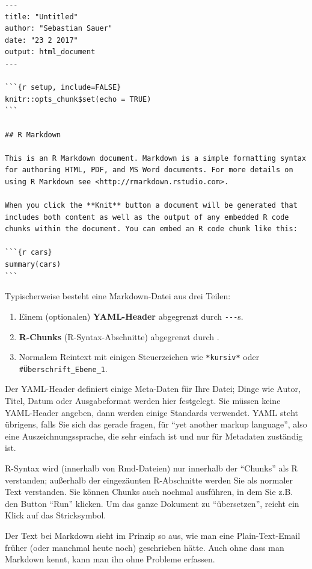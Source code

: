 \documentclass[12pt,]{book}
\providecommand{\tightlist}{%
  \setlength{\itemsep}{0pt}\setlength{\parskip}{0pt}}
\begin{document}
\begin{verbatim}
---
title: "Untitled"
author: "Sebastian Sauer"
date: "23 2 2017"
output: html_document
---

```{r setup, include=FALSE}
knitr::opts_chunk$set(echo = TRUE)
```

## R Markdown

This is an R Markdown document. Markdown is a simple formatting syntax for authoring HTML, PDF, and MS Word documents. For more details on using R Markdown see <http://rmarkdown.rstudio.com>.

When you click the **Knit** button a document will be generated that includes both content as well as the output of any embedded R code chunks within the document. You can embed an R code chunk like this:

```{r cars}
summary(cars)
```
\end{verbatim}

Typischerweise besteht eine Markdown-Datei aus drei Teilen:

\begin{enumerate}
\def\labelenumi{\arabic{enumi}.}
\tightlist
\item
  Einem (optionalen) \textbf{YAML-Header} abgegrenzt durch
  \texttt{-\/-\/-}s.
\item
  \textbf{R-Chunks} (R-Syntax-Abschnitte) abgegrenzt durch
  \texttt{\textasciigrave{}\textasciigrave{}\textasciigrave{}}.
\item
  Normalem Reintext mit einigen Steuerzeichen wie \texttt{*kursiv*} oder
  \texttt{\#Überschrift\_Ebene\_1}.
\end{enumerate}

Der YAML-Header definiert einige Meta-Daten für Ihre Datei; Dinge wie
Autor, Titel, Datum oder Ausgabeformat werden hier festgelegt. Sie
müssen keine YAML-Header angeben, dann werden einige Standards
verwendet. YAML steht übrigens, falls Sie sich das gerade fragen, für
``yet another markup language'', also eine Auszeichnungssprache, die
sehr einfach ist und nur für Metadaten zuständig ist.

R-Syntax wird (innerhalb von Rmd-Dateien) nur innerhalb der ``Chunks''
als R verstanden; außerhalb der eingezäunten R-Abschnitte werden Sie als
normaler Text verstanden. Sie können Chunks auch nochmal ausführen, in
dem Sie z.B. den Button ``Run'' klicken. Um das ganze Dokument zu
``übersetzen'', reicht ein Klick auf das Stricksymbol.

Der Text bei Markdown sieht im Prinzip so aus, wie man eine
Plain-Text-Email früher (oder manchmal heute noch) geschrieben hätte.
Auch ohne dass man Markdown kennt, kann man ihn ohne Probleme erfassen.
\end{document}
